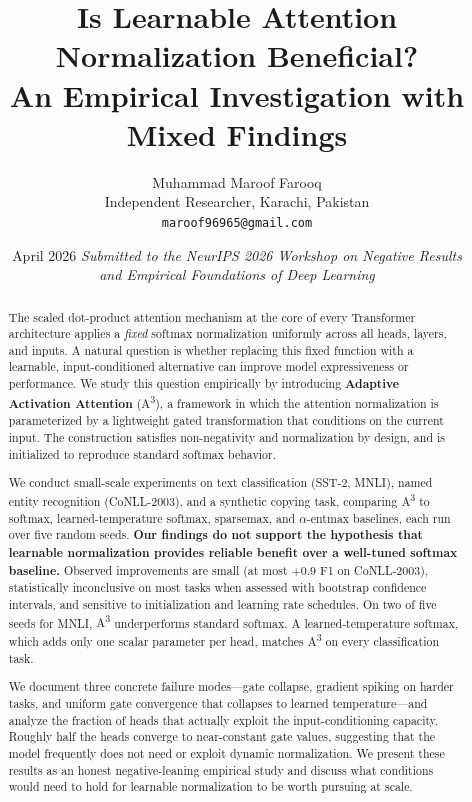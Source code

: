 \documentclass[11pt]{article}
\title{\textbf{Is Learnable Attention Normalization Beneficial? \\[4pt]
An Empirical Investigation with Mixed Findings}}
\author{
  Muhammad Maroof Farooq \\[2pt]
  \small Independent Researcher, Karachi, Pakistan \\
  \small \texttt{maroof96965@gmail.com}
}
\date{April 2026 \quad
\textit{Submitted to the NeurIPS 2026 Workshop on Negative Results\\
and Empirical Foundations of Deep Learning}}
\newcommand{\AAA}{\textsc{A\textsuperscript{3}}}
\begin{document}
\maketitle

\begin{abstract}
The scaled dot-product attention mechanism at the core of every Transformer architecture applies a \emph{fixed} softmax normalization uniformly across all heads, layers, and inputs. A natural question is whether replacing this fixed function with a learnable, input-conditioned alternative can improve model expressiveness or performance. We study this question empirically by introducing \textbf{Adaptive Activation Attention} (\AAA{}), a framework in which the attention normalization is parameterized by a lightweight gated transformation that conditions on the current input. The construction satisfies non-negativity and normalization by design, and is initialized to reproduce standard softmax behavior.

We conduct small-scale experiments on text classification (SST-2, MNLI), named entity recognition (CoNLL-2003), and a synthetic copying task, comparing \AAA{} to softmax, learned-temperature softmax, sparsemax, and $\alpha$-entmax baselines, each run over five random seeds. \textbf{Our findings do not support the hypothesis that learnable normalization provides reliable benefit over a well-tuned softmax baseline.} Observed improvements are small (at most $+0.9$ F1 on CoNLL-2003), statistically inconclusive on most tasks when assessed with bootstrap confidence intervals, and sensitive to initialization and learning rate schedules. On two of five seeds for MNLI, \AAA{} underperforms standard softmax. A learned-temperature softmax, which adds only one scalar parameter per head, matches \AAA{} on every classification task.

We document three concrete failure modes---gate collapse, gradient spiking on harder tasks, and uniform gate convergence that collapses to learned temperature---and analyze the fraction of heads that actually exploit the input-conditioning capacity. Roughly half the heads converge to near-constant gate values, suggesting that the model frequently does not need or exploit dynamic normalization. We present these results as an honest negative-leaning empirical study and discuss what conditions would need to hold for learnable normalization to be worth pursuing at scale.
\end{abstract}
\end{document}
